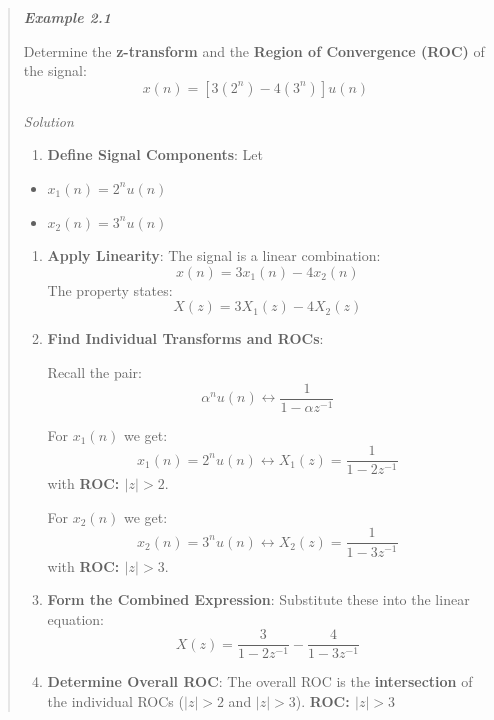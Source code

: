 \begin{quote}
\textbf{\emph{Example 2.1}}

Determine the \textbf{z-transform} and the \textbf{Region of Convergence
(ROC)} of the signal: \[x(n) = [3(2^n) - 4(3^n)]u(n)\]

\emph{Solution}

\begin{enumerate}
\def\labelenumi{\arabic{enumi}.}
\tightlist
\item
  \textbf{Define Signal Components}: Let
\end{enumerate}

\begin{itemize}
\tightlist
\item
  \(x_1(n) = 2^n u(n)\)
\item
  \(x_2(n) = 3^n u(n)\)
\end{itemize}

\begin{enumerate}
\def\labelenumi{\arabic{enumi}.}
\setcounter{enumi}{1}
\item
  \textbf{Apply Linearity}: The signal is a linear combination:
  \[x(n) = 3x_1(n) - 4x_2(n)\] The property states:
  \[X(z) = 3X_1(z) - 4X_2(z)\]
\item
  \textbf{Find Individual Transforms and ROCs}:

  Recall the pair:
  \[\alpha^n u(n) \leftrightarrow \frac{1}{1-\alpha z^{-1}}\]

  For \(x_1(n)\) we get:
  \[x_1(n) = 2^n u(n) \leftrightarrow  X_1(z) = \frac{1}{1-2z^{-1}}\]
  with \textbf{ROC: \(|z| > 2\)}.

  For \(x_2(n)\) we get:
  \[x_2(n) = 3^n u(n) \leftrightarrow X_2(z) = \frac{1}{1-3z^{-1}}\]
  with \textbf{ROC: \(|z| > 3\)}.
\item
  \textbf{Form the Combined Expression}: Substitute these into the
  linear equation:
  \textbf{\[X(z) = \frac{3}{1-2z^{-1}} - \frac{4}{1-3z^{-1}}\]}
\item
  \textbf{Determine Overall ROC}: The overall ROC is the
  \textbf{intersection} of the individual ROCs (\(|z| > 2\) and
  \(|z| > 3\)). \textbf{ROC: \(|z| > 3\)}
\end{enumerate}
\end{quote}

